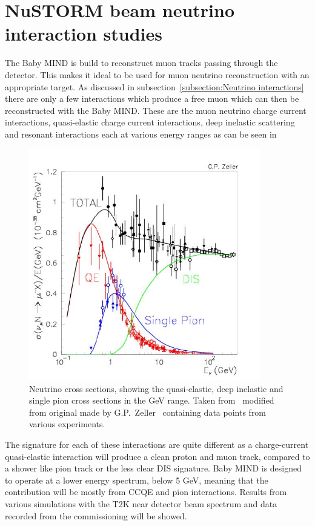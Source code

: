 \chapter{NuSTORM beam neutrino interaction studies}
\label{c:neutrinoNuSTORM}

The Baby MIND is build to reconstruct muon tracks passing through the detector. This makes it ideal to be used for muon neutrino reconstruction with an appropriate target. As discussed in subsection~\ref{subsection:Neutrino interactions} there are only a few interactions which produce a free muon which can then be reconstructed with the Baby MIND. These are the muon neutrino charge current interactions, quasi-elastic charge current interactions, deep inelastic scattering and resonant interactions each at various energy ranges as can be seen in 

\begin{figure}[h!]
\centering
\includegraphics[width=0.9\textwidth]{figures/figs_zeller-total-numode.png}
\caption{Neutrino cross sections, showing the quasi-elastic, deep inelastic and single pion cross sections in the GeV range. Taken from~\cite{82McFarland} modified from original made by G.P.~Zeller~\cite{13PDG} containing data points from various experiments.}
\label{fig:neutrinoInteractionsFig}
\end{figure}

The signature for each of these interactions are quite different as a charge-current quasi-elastic interaction will produce a clean proton and muon track, compared to a shower like pion track or the less clear DIS signature. Baby MIND is designed to operate at a lower energy spectrum, below 5 GeV, meaning that the contribution will be mostly from CCQE and pion interactions. Results from various simulations with the T2K near detector beam spectrum and data recorded from the commissioning will be showed.

